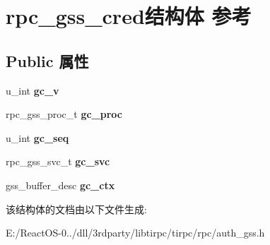 \hypertarget{structrpc__gss__cred}{}\section{rpc\+\_\+gss\+\_\+cred结构体 参考}
\label{structrpc__gss__cred}
\subsection*{Public 属性}
\begin{DoxyCompactItemize}
\item 
\mbox{\label{structrpc__gss__cred_a3e9ceeee512a7050b2a07968d683a2a4}} 
u\+\_\+int {\bfseries gc\+\_\+v}
\item 
\mbox{\label{structrpc__gss__cred_a08507090888a79e71aac0c819b40d7ae}} 
rpc\+\_\+gss\+\_\+proc\+\_\+t {\bfseries gc\+\_\+proc}
\item 
\mbox{\label{structrpc__gss__cred_a422f8b72c7b3d1aed1157600d4766433}} 
u\+\_\+int {\bfseries gc\+\_\+seq}
\item 
\mbox{\label{structrpc__gss__cred_a04b75bb336ef694cc67eef528c2fc332}} 
rpc\+\_\+gss\+\_\+svc\+\_\+t {\bfseries gc\+\_\+svc}
\item 
\mbox{\label{structrpc__gss__cred_afd545394094a26793ac8a94aca85f2a8}} 
gss\+\_\+buffer\+\_\+desc {\bfseries gc\+\_\+ctx}
\end{DoxyCompactItemize}


该结构体的文档由以下文件生成\+:\begin{DoxyCompactItemize}
\item 
E\+:/\+React\+O\+S-\/0../dll/3rdparty/libtirpc/tirpc/rpc/auth\+\_\+gss.\+h\end{DoxyCompactItemize}
